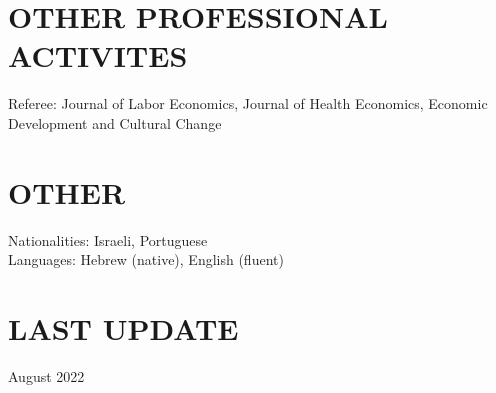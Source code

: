 \documentclass[margin]{res} %
\begin{document}
\begin{resume}
\section{OTHER PROFESSIONAL ACTIVITES} 

Referee: Journal of Labor Economics, Journal of Health Economics, Economic Development and Cultural Change
\\
\section{OTHER} 
Nationalities: Israeli, Portuguese \\
Languages: Hebrew (native), English (fluent) \\

\section{LAST UPDATE} 
August 2022

\end{resume}
\end{document}
